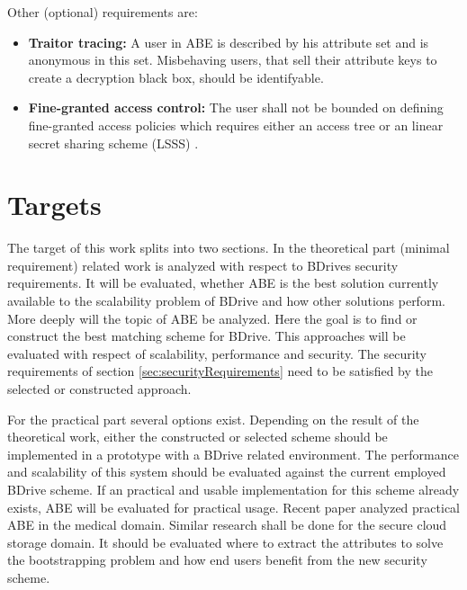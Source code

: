 \documentclass[twocolumn]{article}
\begin{document}
\noindent Other (optional) requirements are: 
\begin{itemize}
	\item \textbf{Traitor tracing:} A user in ABE is described by his attribute set and is anonymous in this set. Misbehaving users, that sell their attribute keys to create a decryption black box, should be identifyable. \cite{liu2016practical}
	\item \textbf{Fine-granted access control:} The user shall not be bounded on defining fine-granted access policies which requires either an access tree \cite{bethencourt2007ciphertext} or an linear secret sharing scheme (LSSS) \cite{yang2013dac} \cite{li2016secure} \cite{wu2017security} \cite{li2013matrix} \cite{liu2016practical}.
\end{itemize}

\section{Targets}
The target of this work splits into two sections. In the theoretical part (minimal requirement) related work is analyzed with respect to BDrives security requirements. It will be evaluated, whether ABE is the best solution currently available to the scalability problem of BDrive and how other solutions perform. More deeply will the topic of ABE be analyzed. Here the goal is to find or construct the best matching scheme for BDrive. This approaches will be evaluated with respect of scalability, performance and security. The security requirements of section \ref{sec:securityRequirements} need to be satisfied by the selected or constructed approach.

For the practical part several options exist. Depending on the result of the theoretical work, either the constructed or selected scheme should be implemented in a prototype with a BDrive related environment. The performance and scalability of this system should be evaluated against the current employed BDrive scheme. If an practical and usable implementation for this scheme already exists, ABE will be evaluated for practical usage. Recent paper analyzed practical ABE in the medical domain. \cite{thatmann2016please} \cite{li2013scalable} \cite{akinyele2011securing} Similar research shall be done for the secure cloud storage domain. It should be evaluated where to extract the attributes to solve the bootstrapping problem and how end users benefit from the new security scheme.
 
\end{document}
